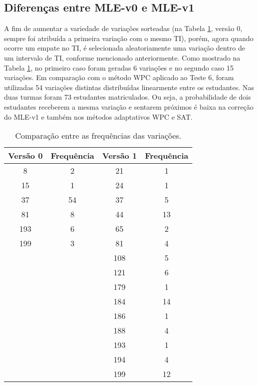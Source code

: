 \subsection{Diferenças entre MLE-v0 e  MLE-v1}

A fim de aumentar a variedade de variações sorteadas (na Tabela \ref{tab:MLE_frequencias}, versão 0, sempre foi atribuída a primeira variação com o mesmo TI), porém, agora quando ocorre um empate no TI, é selecionada aleatoriamente uma variação dentro de um intervalo de TI, conforme mencionado anteriormente. Como mostrado na Tabela \ref{tab:MLE_frequencias}, no primeiro caso foram geradas 6 variações e no segundo caso 15 variações. Em comparação com o método WPC aplicado ao Teste 6, foram utilizadas 54 variações distintas distribuídas linearmente entre os estudantes. Nas duas turmas foram 73 estudantes matriculados. Ou seja, a probabilidade de dois estudantes receberem a mesma variação e sentarem próximos é baixa na correção do MLE-v1 e também nos métodos adaptativos WPC e SAT.

\begin{table}[!ht]
    \centering
    \caption{Comparação entre as frequências das variações.}
    \label{tab:MLE_frequencias}
    \begin{tabular}{|c|c|c|c|}
        \hline
        \cellcolor{green!25} \textbf{Versão 0} & \cellcolor{green!25} \textbf{Frequência} & \cellcolor{yellow!25} \textbf{Versão 1} & \cellcolor{yellow!25} \textbf{Frequência} \\
        \hline
        8 & 2 & 21 & 1 \\
        15 & 1 & 24 & 1 \\
        37 & 54 & 37 & 5 \\
        81 & 8 & 44 & 13 \\
        193 & 6 & 65 & 2 \\
        199 & 3 & 81 & 4 \\
        & & 108 & 5 \\
        & & 121 & 6 \\
        & & 179 & 1 \\
        & & 184 & 14 \\
        & & 186 & 1 \\
        & & 188 & 4 \\
        & & 193 & 1 \\
        & & 194 & 4 \\
        & & 199 & 12 \\
        \hline
    \end{tabular}
\end{table}

